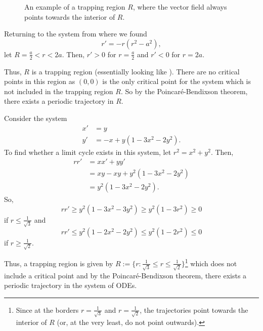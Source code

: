 \begin{figure}[!ht]
	\centering
	\caption{An example of a trapping region $R$, where the vector field always points towards the interior of $R$.}
	\label{fig:trappingregion}
\end{figure}

\begin{eg}
	Returning to the system from  where we found
	\[
	r' = -r(r^2 - a^2),
	\]
	let $R = {\frac{a}{2}<r<2a}$. Then, $r' > 0$ for $r = \frac{a}{2}$ and $r'<0$ for $r = 2a$.
	
	Thus, $R$ is a trapping region (essentially looking like ). There are no critical points in this region as $(0,0)$ is the only critical point for the system which is not included in the trapping region $R$. So by the Poincaré-Bendixson theorem, there exists a periodic trajectory in $R$.
\end{eg}

\begin{eg}
	Consider the system
	\begin{align*}
		x' &= y \\
		y' &= -x + y(1-3x^2-2y^2).
	\end{align*}
	To find whether a limit cycle exists in this system, let $r^2 = x^2 + y^2$. Then,
	\begin{align*}
		rr' & = xx' + yy' \\
		& = xy - xy + y^2(1-3x^2-2y^2) \\
		& = y^2(1-3x^2-2y^2).
	\end{align*}
	So, 
	\[
	rr' \geq y^2(1 - 3x^2 - 3y^2) \geq y^2(1-3r^2) \geq 0 
	\] if $r \leq \frac{1}{\sqrt{3}}$
	and
	\[
	rr' \leq y^2(1 - 2x^2 - 2y^2) \leq y^2(1-2r^2) \leq 0 
	\] if $r \geq \frac{1}{\sqrt{2}}$.
	
	Thus, a trapping region is given by $R := \{r: \frac{1}{\sqrt{3}} \leq r \leq \frac{1}{\sqrt{2}}\}$\footnote{Since at the borders $r=\frac{1}{\sqrt{3}}$ and $r=\frac{1}{\sqrt{2}}$, the trajectories point towards the interior of $R$ (or, at the very least, do not point outwards).} which does not include a critical point and by the Poincaré-Bendixson theorem, there exists a periodic trajectory in the system of ODEs.
\end{eg}